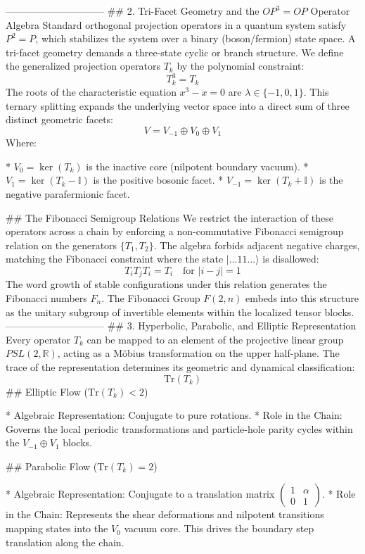------------------------------
## 2. Tri-Facet Geometry and the $OP^3 = OP$ Operator Algebra
Standard orthogonal projection operators in a quantum system satisfy $P^2 = P$, which stabilizes the system over a binary (boson/fermion) state space. A tri-facet geometry demands a three-state cyclic or branch structure. We define the generalized projection operators $T_k$ by the polynomial constraint:
$$T_k^3 = T_k$$ 
The roots of the characteristic equation $x^3 - x = 0$ are $\lambda \in \{-1, 0, 1\}$. This ternary splitting expands the underlying vector space into a direct sum of three distinct geometric facets:
$$V = V_{-1} \oplus V_0 \oplus V_1$$ 
Where:

* $V_0 = \ker(T_k)$ is the inactive core (nilpotent boundary vacuum).
* $V_1 = \ker(T_k - \mathbb{I})$ is the positive bosonic facet.
* $V_{-1} = \ker(T_k + \mathbb{I})$ is the negative parafermionic facet.

## The Fibonacci Semigroup Relations
We restrict the interaction of these operators across a chain by enforcing a non-commutative Fibonacci semigroup relation on the generators $\{T_1, T_2\}$. The algebra forbids adjacent negative charges, matching the Fibonacci constraint where the state $\vert{} \dots 11 \dots \rangle$ is disallowed:
$$T_i T_j T_i = T_i \quad \text{for } \vert{}i-j\vert{} = 1$$ 
The word growth of stable configurations under this relation generates the Fibonacci numbers $F_n$. The Fibonacci Group $F(2, n)$ embeds into this structure as the unitary subgroup of invertible elements within the localized tensor blocks.
------------------------------
## 3. Hyperbolic, Parabolic, and Elliptic Representation
Every operator $T_k$ can be mapped to an element of the projective linear group $PSL(2, \mathbb{R})$, acting as a Möbius transformation on the upper half-plane. The trace of the representation determines its geometric and dynamical classification:
$$\text{Tr}(T_k)$$ 
## Elliptic Flow ($\text{Tr}(T_k) < 2$)

* Algebraic Representation: Conjugate to pure rotations.
* Role in the Chain: Governs the local periodic transformations and particle-hole parity cycles within the $V_{-1} \oplus V_1$ blocks.

## Parabolic Flow ($\text{Tr}(T_k) = 2$)

* Algebraic Representation: Conjugate to a translation matrix $\begin{pmatrix} 1 & \alpha \\ 0 & 1 \end{pmatrix}$.
* Role in the Chain: Represents the shear deformations and nilpotent transitions mapping states into the $V_0$ vacuum core. This drives the boundary step translation along the chain.

